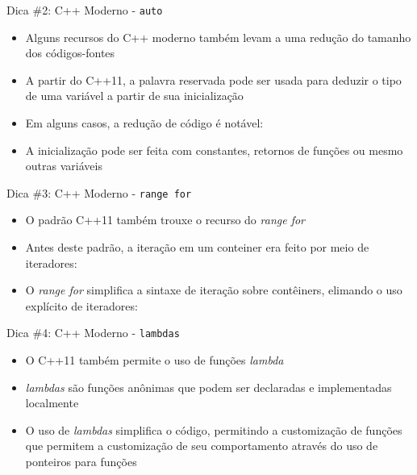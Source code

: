 \begin{frame}[fragile]{Dica \#2: C++ Moderno - \texttt{auto}}

    \begin{itemize}
        \item Alguns recursos do C++ moderno também levam a uma redução do tamanho dos 
        códigos-fontes

        \item A partir do C++11, a palavra reservada  pode ser usada para 
            deduzir o tipo de uma variável a partir de sua inicialização

        \item Em alguns casos, a redução de código é notável:

        \item A inicialização pode ser feita com constantes, retornos de funções ou mesmo
            outras variáveis
    \end{itemize}

\end{frame}

\begin{frame}[fragile]{Dica \#3: C++ Moderno - \texttt{range for}}

    \begin{itemize}
        \item O padrão C++11 também trouxe o recurso do \textit{range for}

        \item Antes deste padrão, a iteração em um conteiner era feito por meio de iteradores:

        \item O \textit{range for} simplifica a sintaxe de iteração sobre contêiners,
            elimando o uso explícito de iteradores:
    \end{itemize}

\end{frame}

\begin{frame}[fragile]{Dica \#4: C++ Moderno - \texttt{lambdas}}

    \begin{itemize}
        \item O C++11 também permite o uso de funções \textit{lambda}

        \item \textit{lambdas} são funções anônimas que podem ser declaradas e 
            implementadas localmente

        \item O uso de \textit{lambdas} simplifica o código, permitindo a customização de
            funções que permitem a customização de seu comportamento através do uso de
            ponteiros para funções
    \end{itemize}

\end{frame}

